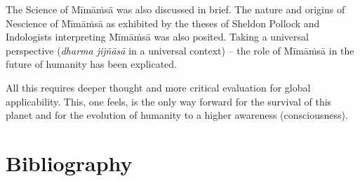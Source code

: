 The Science of Mīmāṁsā was also discussed in brief. The nature and origins of Nescience of Mīmāṁsā as exhibited by the theses of Sheldon Pollock and Indologists interpreting Mīmāṁsā was also posited. Taking a universal perspective (\textit{dharma jijñāsā} in a universal context) – the role of Mīmāṁsā in the future of humanity has been explicated.

All this requires deeper thought and more critical evaluation for global applicability. This, one feels, is the only way forward for the survival of this planet and for the evolution of humanity to a higher awareness (consciousness).


\section*{Bibliography}

